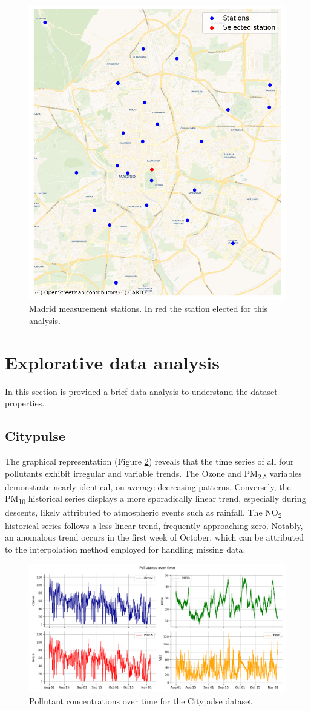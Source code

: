 \begin{figure}[h]
    \centering
    \includegraphics[width=0.5\linewidth]{images/madridsensors.png}
    \caption{Madrid measurement stations. In red the station elected for this analysis.}
    \label{fig:madridsensors}
\end{figure}

\newpage
\section{Explorative data analysis}
In this section is provided a brief data analysis to understand the dataset properties.

\subsection{Citypulse}

The graphical representation (Figure \ref{fig:ts_citypulse}) reveals that the time series of all four pollutants exhibit irregular and variable trends. The Ozone and PM\textsubscript{2.5} variables demonstrate nearly identical, on average decreasing patterns. Conversely, the PM\textsubscript{10} historical series displays a more sporadically linear trend, especially during descents, likely attributed to atmospheric events such as rainfall. The NO\textsubscript{2} historical series follows a less linear trend, frequently approaching zero. Notably, an anomalous trend occurs in the first week of October, which can be attributed to the interpolation method employed for handling missing data.

\begin{figure}[h]
    \centering
    \includegraphics[width=1\linewidth]{images/ts_citypulse.png}
    \caption{Pollutant concentrations over time for the Citypulse dataset}
    \label{fig:ts_citypulse}
\end{figure}

